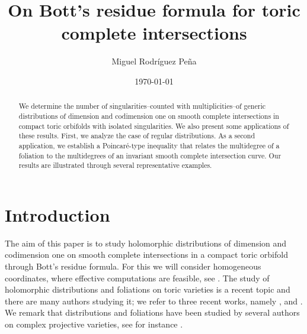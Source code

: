 \documentclass[11pt]{amsart}
\theoremstyle{plain}
\theoremstyle{definition}
\begin{document}
\title[On Bott's residue formula for toric complete intersections]
{On Bott's residue formula for toric complete intersections}

\author{Miguel Rodr\'iguez Pe\~na}
\address{Arnulfo Miguel Rodr\'iguez Pe\~na \\
ICEX-UFMG, Departamento de Matem\'atica,
Av. Ant\^onio Carlos, 6627, 31270-901  Belo Horizonte, MG, Brazil.}

\date\today

\begin{abstract}
We determine the number of singularities--counted with multiplicities--of generic distributions of dimension and codimension 
one on smooth complete intersections in compact toric orbifolds with isolated singularities. We also present some applications of these results. First, we analyze the case of regular distributions. As a second application, we establish a Poincar\'e-type inequality that relates the multidegree of a foliation to the multidegrees of an invariant smooth complete intersection curve. Our results are illustrated through several representative examples.
\end{abstract}

\maketitle


\section{Introduction}

The aim of this paper is to study holomorphic distributions of dimension 
and codimension one on smooth complete intersections in a compact toric orbifold through Bott's residue formula. 
For this we will consider homogeneous coordinates, where effective computations are feasible, see \cite{Cox}.
The study of holomorphic distributions and foliations on toric varieties is a recent topic and there are many authors studying it;
we refer to three recent works, namely \cite{FJM}, \cite{Mig2} and \cite{WWA}.
We remark that distributions and foliations have been studied by several authors on complex projective varieties, 
see for instance \cite{Ca,OmCoJa,CCM,GJM,Iza,Jou}. \\
\end{document}
